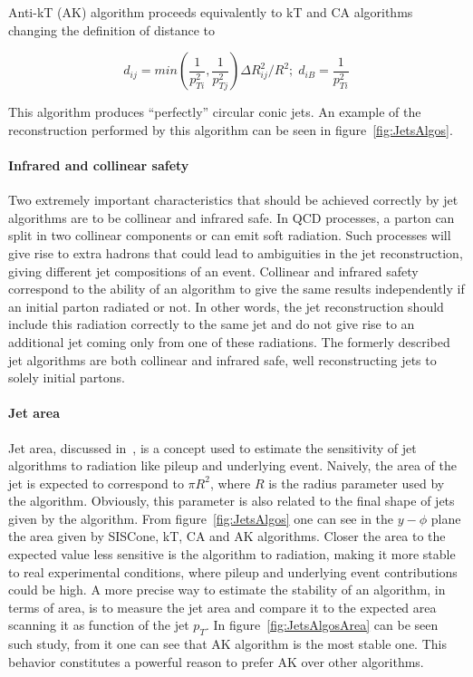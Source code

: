 Anti-kT (AK) algorithm proceeds equivalently to kT and CA algorithms changing the definition of distance to

\begin{equation}
  \label{eq:antikt}
  d_{ij}=min\left(\frac{1}{p_{Ti}^{2}},\frac{1}{p_{Tj}^{2}}\right)\Delta R_{ij}^{2}/R^{2};\; d_{iB}=\frac{1}{p_{Ti}^{2}}
\end{equation} 

This algorithm produces ``perfectly'' circular conic jets. An example of the reconstruction performed by this algorithm can be seen in figure~\ref{fig:JetsAlgos}.

\paragraph{Infrared and collinear safety}

Two extremely important characteristics that should be achieved correctly by jet algorithms are to be collinear and infrared safe. In QCD processes, a parton can split in two collinear components or can emit soft radiation. Such processes will give rise to extra hadrons that could lead to ambiguities in the jet reconstruction, giving different jet compositions of an event. Collinear and infrared safety correspond to the ability of an algorithm to give the same results independently if an initial parton radiated or not. In other words, the jet reconstruction should include this radiation correctly to the same jet and do not give rise to an additional jet coming only from one of these radiations. The formerly described jet algorithms are both collinear and infrared safe, well reconstructing jets to solely initial partons. 

\paragraph{Jet area}

Jet area, discussed in~\cite{Cacciari:2008gn}, is a concept used to estimate the sensitivity of jet algorithms to radiation like pileup and underlying event. Naively, the area of the jet is expected to correspond to $\pi R^{2}$, where $R$ is the radius parameter used by the algorithm. Obviously, this parameter is also related to the final shape of jets given by the algorithm. From figure~\ref{fig:JetsAlgos} one can see in the $y-\phi$ plane the area given by SISCone, kT, CA and AK algorithms. Closer the area to the expected value less sensitive is the algorithm to radiation, making it more stable to real experimental conditions, where pileup and underlying event contributions could be high. A more precise way to estimate the stability of an algorithm, in terms of area, is to measure the jet area and compare it to the expected area scanning it as function of the jet $p_{T}$. In figure~\ref{fig:JetsAlgosArea} can be seen such study, from it one can see that AK algorithm is the most stable one. This behavior constitutes a powerful reason to prefer AK over other algorithms. 

